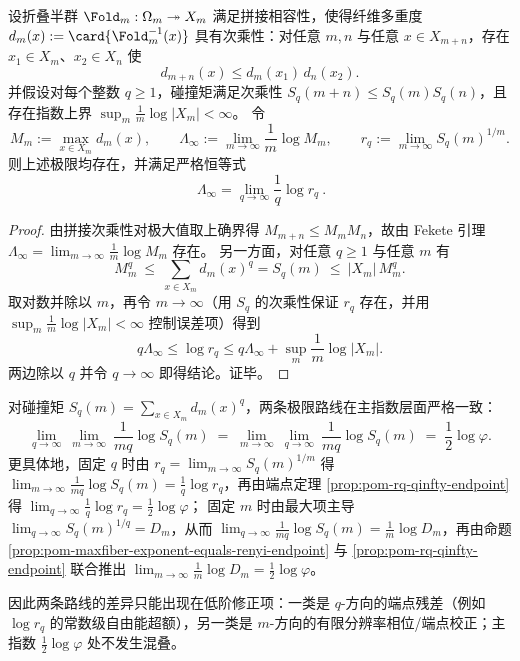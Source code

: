 \begin{proposition}\label{prop:pom-maxfiber-exponent-equals-renyi-endpoint}
设折叠半群 \(\Fold_m:\Omega_m\twoheadrightarrow X_m\) 满足拼接相容性，使得纤维多重度
\(
d_m(x):=\card{\Fold_m^{-1}(x)}
\)
具有次乘性：对任意 \(m,n\) 与任意 \(x\in X_{m+n}\)，存在 \(x_1\in X_m\)、\(x_2\in X_n\) 使
\[
d_{m+n}(x)\le d_m(x_1)\,d_n(x_2).
\]
并假设对每个整数 \(q\ge 1\)，碰撞矩满足次乘性 \(S_q(m+n)\le S_q(m)S_q(n)\)，且存在指数上界
\(
\sup_m \frac{1}{m}\log|X_m|<\infty
\)。
令
\[
M_m:=\max_{x\in X_m} d_m(x),\qquad
\Lambda_\infty:=\lim_{m\to\infty}\frac{1}{m}\log M_m,\qquad
r_q:=\lim_{m\to\infty} S_q(m)^{1/m}.
\]
则上述极限均存在，并满足严格恒等式
\[
\boxed{\ \Lambda_\infty=\lim_{q\to\infty}\frac{1}{q}\log r_q\ }.
\]
\end{proposition}
\begin{proof}
由拼接次乘性对极大值取上确界得 \(M_{m+n}\le M_mM_n\)，故由 Fekete 引理 \(\Lambda_\infty=\lim_{m\to\infty}\frac{1}{m}\log M_m\) 存在。
另一方面，对任意 \(q\ge 1\) 与任意 \(m\) 有
\[
M_m^q\ \le\ \sum_{x\in X_m}d_m(x)^q=S_q(m)\ \le\ |X_m|\,M_m^q.
\]
取对数并除以 \(m\)，再令 \(m\to\infty\)（用 \(S_q\) 的次乘性保证 \(r_q\) 存在，并用 \(\sup_m \frac{1}{m}\log|X_m|<\infty\) 控制误差项）得到
\[
q\Lambda_\infty\le \log r_q\le q\Lambda_\infty+\sup_m\frac{1}{m}\log|X_m|.
\]
两边除以 \(q\) 并令 \(q\to\infty\) 即得结论。证毕。
\end{proof}

\begin{corollary}\label{cor:pom-double-limit-commute-principal-exponent}
对碰撞矩 \(S_q(m)=\sum_{x\in X_m}d_m(x)^q\)，两条极限路线在主指数层面严格一致：
\[
\lim_{q\to\infty}\ \lim_{m\to\infty}\ \frac{1}{mq}\log S_q(m)
\;=\;
\lim_{m\to\infty}\ \lim_{q\to\infty}\ \frac{1}{mq}\log S_q(m)
\;=\;\frac12\log\varphi.
\]
更具体地，固定 \(q\) 时由 \(r_q=\lim_{m\to\infty}S_q(m)^{1/m}\) 得
\(
\lim_{m\to\infty}\frac{1}{mq}\log S_q(m)=\frac{1}{q}\log r_q
\)，再由端点定理 \ref{prop:pom-rq-qinfty-endpoint} 得 \(\lim_{q\to\infty}\frac{1}{q}\log r_q=\frac12\log\varphi\)；
固定 \(m\) 时由最大项主导 \(\lim_{q\to\infty}S_q(m)^{1/q}=D_m\)，从而
\(
\lim_{q\to\infty}\frac{1}{mq}\log S_q(m)=\frac{1}{m}\log D_m
\)，再由命题 \ref{prop:pom-maxfiber-exponent-equals-renyi-endpoint} 与 \ref{prop:pom-rq-qinfty-endpoint} 联合推出 \(\lim_{m\to\infty}\frac{1}{m}\log D_m=\frac12\log\varphi\)。
\par
因此两条路线的差异只能出现在低阶修正项：一类是 \(q\)-方向的端点残差（例如 \(\log r_q\) 的常数级自由能超额），另一类是 \(m\)-方向的有限分辨率相位/端点校正；主指数 \(\tfrac12\log\varphi\) 处不发生混叠。
\end{corollary}

